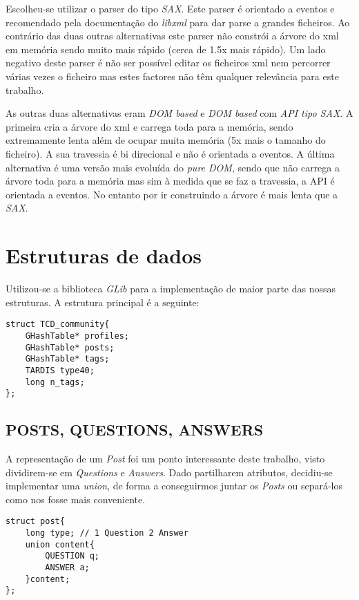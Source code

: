 \documentclass[letterpaper, 10 pt, conference]{IEEEtran}  %
\begin{document}
Escolheu-se utilizar o parser do tipo \textit{SAX}. Este parser é orientado a eventos e recomendado pela documentação do \textit{libxml} para dar parse a grandes ficheiros. Ao contrário das duas outras alternativas este parser não constrói a árvore do xml em memória sendo muito mais rápido (cerca de 1.5x mais rápido). Um lado negativo deste parser é não ser possível editar os ficheiros xml nem percorrer várias vezes o ficheiro mas estes factores não têm qualquer relevância para este trabalho.

As outras duas alternativas eram \textit{DOM based} e \textit{DOM based} com \textit{API tipo SAX}.
A primeira cria a árvore do xml e carrega toda para a memória, sendo extremamente lenta além de ocupar muita memória (5x mais o tamanho do ficheiro). A sua travessia é bi direcional e não é orientada a eventos.
A última alternativa é uma versão mais evoluída do \textit{pure DOM}, sendo que não carrega a árvore toda para a memória mas sim à medida que se faz a travessia, a API é orientada a eventos. No entanto por ir construindo a árvore é mais lenta que a \textit{SAX}.

\section{Estruturas de dados}

Utilizou-se a biblioteca \textit{GLib} para a implementação de maior parte das nossas estruturas. A estrutura principal é a seguinte:
\begin{lstlisting}
struct TCD_community{
    GHashTable* profiles;
    GHashTable* posts;
    GHashTable* tags;
    TARDIS type40;
    long n_tags;
};
\end{lstlisting}

\subsection{POSTS, QUESTIONS, ANSWERS}

A representação de um \textit{Post} foi um ponto interessante deste trabalho, visto dividirem-se em \textit{Questions} e \textit{Answers}. Dado partilharem atributos, decidiu-se implementar uma \textit{union}, de forma a conseguirmos juntar os \textit{Posts} ou separá-los como nos fosse mais conveniente.
\begin{lstlisting}
struct post{
    long type; // 1 Question 2 Answer
    union content{
        QUESTION q;
        ANSWER a;
    }content;
};
\end{lstlisting}
\end{document}
